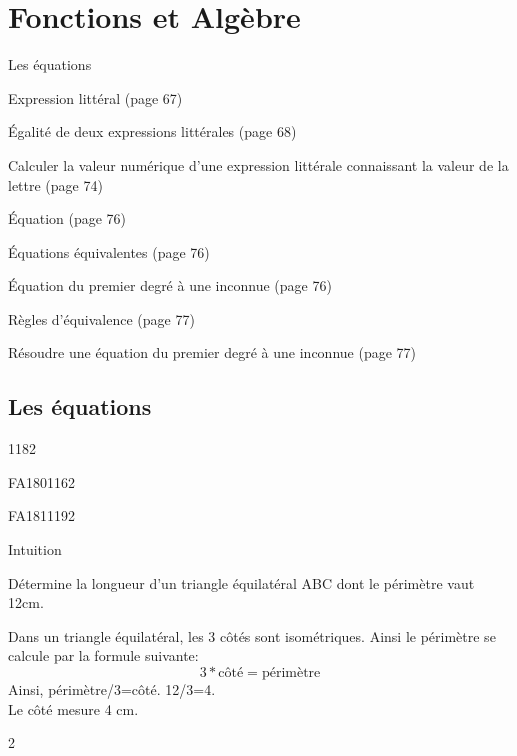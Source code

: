 \documentclass[a4paper,11pt]{report}
\begin{document}
\newcommand{\chapterName}{Fonctions et Algèbre}
\newcommand{\serieName}{Les équations}

\chapter*{\chapterName}
\thispagestyle{empty}


\begin{amL}{\serieName}{
\item Expression littéral (page 67)
\item Égalité de deux expressions littérales (page 68)
\item Calculer la valeur numérique d'une expression littérale connaissant la valeur de la lettre (page 74)
\item Équation (page 76)
\item Équations équivalentes (page 76)
\item Équation du premier degré à une inconnue (page 76)
\item Règles d'équivalence (page 77)
\item Résoudre une équation du premier degré à une inconnue (page 77)

}
\end{amL}



\section*{\serieName}
\setcounter{page}{1}


\begin{QSJ}{118}{2}
\end{QSJ}

\begin{exol}{FA180}{116}{2}
\end{exol}

\begin{exof}{FA181}{119}{2}
\end{exof}

\begin{resolu}
{Intuition}
    {Détermine la longueur d'un triangle équilatéral ABC dont le périmètre vaut 12cm.
    \newline

   Dans un triangle équilatéral, les 3 côtés sont isométriques. Ainsi le périmètre se calcule par la formule suivante:
\[3*\text{côté}=\text{périmètre}
\]
Ainsi, périmètre/3=côté. 12/3=4.\\
Le côté mesure 4 cm.
    }
    {2}
\end{resolu}
\end{document}
